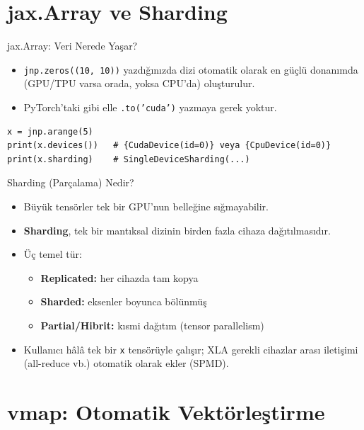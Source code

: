 \documentclass[aspectratio=169]{beamer}
\begin{document}
\section{jax.Array ve Sharding}

\begin{frame}[fragile]{jax.Array: Veri Nerede Yaşar?}
  \begin{itemize}
    \item \texttt{jnp.zeros((10, 10))} yazdığınızda dizi otomatik olarak en güçlü donanımda (GPU/TPU varsa orada, yoksa CPU'da) oluşturulur.
    \item PyTorch'taki gibi elle \texttt{.to('cuda')} yazmaya gerek yoktur.
  \end{itemize}
  \begin{lstlisting}
x = jnp.arange(5)
print(x.devices())   # {CudaDevice(id=0)} veya {CpuDevice(id=0)}
print(x.sharding)    # SingleDeviceSharding(...)
  \end{lstlisting}
\end{frame}

\begin{frame}{Sharding (Parçalama) Nedir?}
  \begin{itemize}
    \item Büyük tensörler tek bir GPU'nun belleğine sığmayabilir.
    \item \textbf{Sharding}, tek bir mantıksal dizinin birden fazla cihaza dağıtılmasıdır.
    \item Üç temel tür:
    \begin{itemize}
      \item \textbf{Replicated:} her cihazda tam kopya
      \item \textbf{Sharded:} eksenler boyunca bölünmüş
      \item \textbf{Partial/Hibrit:} kısmi dağıtım (tensor parallelism)
    \end{itemize}
    \item Kullanıcı hâlâ tek bir \texttt{x} tensörüyle çalışır; XLA gerekli cihazlar arası iletişimi (all-reduce vb.) otomatik olarak ekler (SPMD).
  \end{itemize}
\end{frame}

\section{vmap: Otomatik Vektörleştirme}
\end{document}
